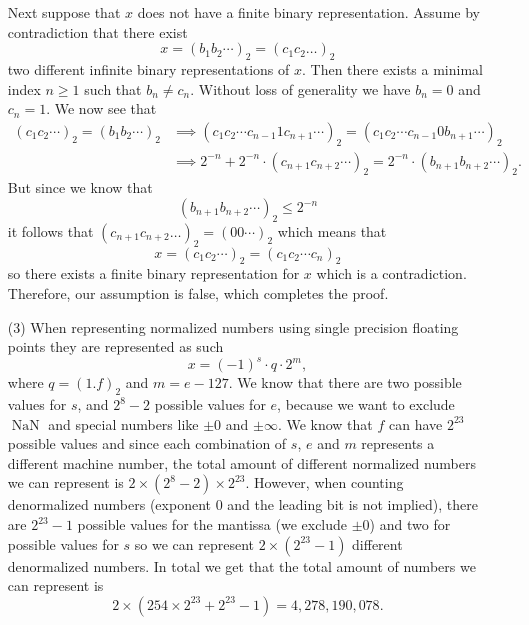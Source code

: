 \documentclass[11pt, a4paper]{article}
\DeclareMathOperator{\NaN}{NaN}
\begin{document}
\begin{solution}
\begin{enumerate}
    Next suppose that $x$ does not have a finite binary representation.
    Assume by contradiction that there exist
    \[
      x = (b_1b_2 \cdots)_2 = (c_1c_2 \dots)_2
    \]
    two different infinite binary representations of $x$.
    Then there exists a minimal index $n \geq 1$ such that $b_n \neq c_n$.
    Without loss of generality we have $b_n = 0$ and $c_n = 1$.
    We now see that
    \begin{align*}
      (c_1c_2 \cdots)_2 = (b_1b_2 \cdots)_2 &\implies
      (c_1c_2\cdots c_{n-1} 1 c_{n+1} \cdots)_2 = 
      (c_1c_2\cdots c_{n-1} 0 b_{n+1} \cdots)_2 \\ &\implies
      2^{-n} + 2^{-n} \cdot (c_{n+1} c_{n+2} \cdots)_2 =
      2^{-n} \cdot (b_{n+1} b_{n+2} \cdots)_2.
    \end{align*}
    But since we know that
    \[
      (b_{n+1} b_{n+2} \cdots)_2 \le 2^{-n}
    \]
    it follows that $(c_{n+1} c_{n+2} \dots)_2 = (00\cdots)_2$ which means
    that
    \[
      x = (c_1 c_2 \cdots)_2 = (c_1 c_2 \cdots c_n)_2
    \]
    so there exists a finite binary representation for $x$ which is a
    contradiction.
    Therefore, our assumption is false, which completes the proof.
  \item[(3)] When representing normalized numbers using single precision
    floating points they are represented as such
    \[
      x = (-1)^{s} \cdot q \cdot 2^{m},
    \]
    where $q = (1.f)_2$ and $m = e - 127$.
    We know that there are two possible values for $s$,
    and $2^8 - 2$ possible values for $e$,
    because we want to exclude $\NaN$ and special numbers like
    $\pm 0$ and $\pm \infty$.
    We know that $f$ can have $2^{23}$ possible values and since each
    combination of $s$, $e$ and $m$ represents a different machine number,
    the total amount of different normalized numbers we can represent is
    $2 \times (2^8 - 2) \times 2^{23}$.
    However, when counting denormalized numbers
    (exponent $0$ and the leading bit is not implied),
    there are $2^{23} - 1$ possible values for the mantissa (we exclude $\pm 0$)
    and two for possible values for $s$
    so we can represent $2 \times (2^{23} - 1)$ different denormalized numbers.
    In total we get that the total amount of numbers we can represent is
    \[
      2 \times (254 \times 2^{23} + 2^{23} - 1) =
      4,\!278,\!190,\!078.
    \]
\end{enumerate}
\end{solution}
\end{document}
